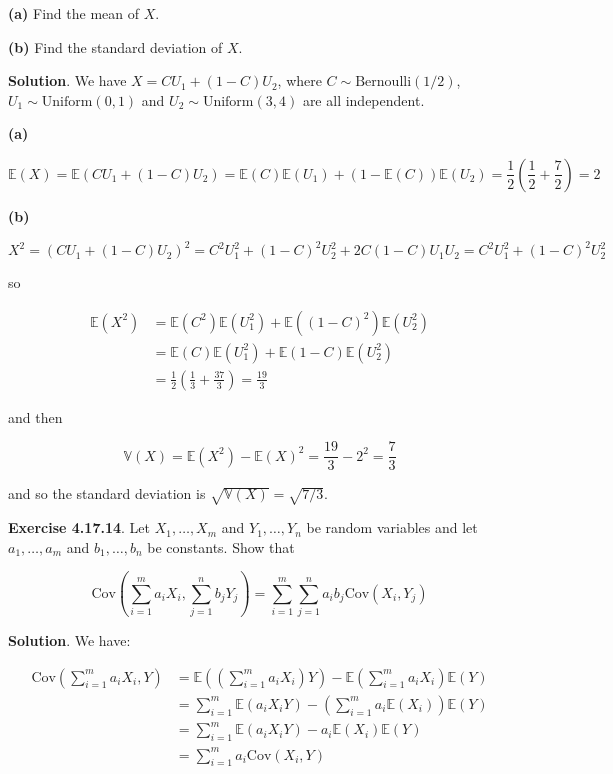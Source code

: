 \textbf{(a)} Find the mean of \(X\).

\textbf{(b)} Find the standard deviation of \(X\).

\textbf{Solution}. We have \(X = C U_1 + (1 - C)U_2\), where
\(C \sim \text{Bernoulli}(1/2)\), \(U_1 \sim \text{Uniform}(0, 1)\) and
\(U_2 \sim \text{Uniform}(3, 4)\) are all independent.

\textbf{(a)}

\[\mathbb{E}(X) = \mathbb{E}(CU_1 + (1 - C)U_2) = \mathbb{E}(C)\mathbb{E}(U_1) + (1 - \mathbb{E}(C))\mathbb{E}(U_2) = \frac{1}{2} \left(\frac{1}{2} + \frac{7}{2}\right) = 2\]

\textbf{(b)}

\[ X^2 = (CU_1 + (1 - C)U_2)^2 = C^2U_1^2 + (1 - C)^2 U_2^2 + 2C(1 - C)U_1U_2 = C^2U_1^2 + (1 - C)^2 U_2^2 \]

so

\begin{align}
\mathbb{E}(X^2) &= \mathbb{E}(C^2)\mathbb{E}(U_1^2) + \mathbb{E}((1 - C)^2) \mathbb{E}(U_2^2) \\
&= \mathbb{E}(C) \mathbb{E}(U_1^2) + \mathbb{E}(1 - C) \mathbb{E}(U_2^2) \\
&= \frac{1}{2} \left( \frac{1}{3} + \frac{37}{3} \right) = \frac{19}{3}
\end{align}

and then

\[ \mathbb{V}(X) = \mathbb{E}(X^2) - \mathbb{E}(X)^2 = \frac{19}{3} - 2^2 = \frac{7}{3} \]

and so the standard deviation is \(\sqrt{\mathbb{V}(X)} = \sqrt{7/3}\).

\textbf{Exercise 4.17.14}. Let \(X_1, \dots, X_m\) and
\(Y_1, \dots, Y_n\) be random variables and let \(a_1, \dots, a_m\) and
\(b_1, \dots, b_n\) be constants. Show that

\[ \text{Cov}\left( \sum_{i=1}^m a_i X_i , \sum_{j=1}^n b_j Y_j \right) = \sum_{i=1}^m \sum_{j=1}^n a_i b_j \text{Cov}(X_i, Y_j) \]

\textbf{Solution}. We have:

\begin{align}
\text{Cov}\left(\sum_{i=1}^m a_i X_i, Y\right) &= \mathbb{E}\left(\left( \sum_{i=1}^m a_i X_i \right) Y\right) - \mathbb{E}\left( \sum_{i=1}^m a_i X_i \right) \mathbb{E}(Y) \\
&= \sum_{i=1}^m \mathbb{E}(a_i X_i Y) - \left( \sum_{i=1}^m a_i \mathbb{E}(X_i) \right) \mathbb{E}(Y) \\
&= \sum_{i=1}^m \mathbb{E}(a_i X_i Y) -  a_i \mathbb{E}(X_i) \mathbb{E}(Y) \\
&= \sum_{i=1}^m a_i \text{Cov}(X_i, Y)
\end{align}

